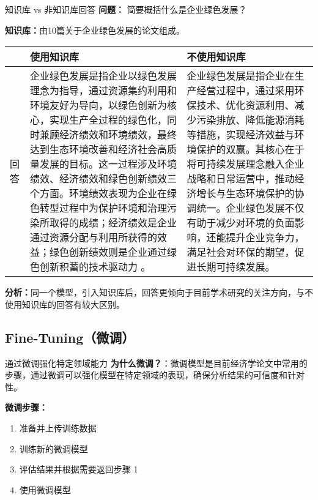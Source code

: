 \documentclass{beamer}
\begin{document}
\begin{frame}[fragile]{知识库 vs 非知识库回答}
\small
\textbf{问题：} 简要概括什么是企业绿色发展？

\textbf{知识库：}由10篇关于企业绿色发展的论文组成。

\begin{table}[h]
\centering
\scriptsize
\begin{tabular}{|p{0.5cm}|p{4.5cm}|p{4.3cm}|}
\hline
\textbf{} & \textbf{使用知识库} & \textbf{不使用知识库} \\
\hline
回答 & 
企业绿色发展是指企业以绿色发展理念为指导，通过资源集约利用和环境友好为导向，以绿色创新为核心，实现生产全过程的绿色化，同时兼顾经济绩效和环境绩效，最终达到生态环境改善和经济社会高质量发展的目标。这一过程涉及环境绩效、经济绩效和绿色创新绩效三个方面。环境绩效表现为企业在绿色转型过程中为保护环境和治理污染所取得的成绩；经济绩效是企业通过资源分配与利用所获得的效益；绿色创新绩效则是企业通过绿色创新积蓄的技术驱动力 。
& 
企业绿色发展是指企业在生产经营过程中，通过采用环保技术、优化资源利用、减少污染排放、降低能源消耗等措施，实现经济效益与环境保护的双赢。其核心在于将可持续发展理念融入企业战略和日常运营中，推动经济增长与生态环境保护的协调统一。企业绿色发展不仅有助于减少对环境的负面影响，还能提升企业竞争力，满足社会对环保的期望，促进长期可持续发展。 \\
\hline
\end{tabular}
\end{table}

\textbf{分析：}同一个模型，引入知识库后，回答更倾向于目前学术研究的关注方向，与不使用知识库的回答有较大区别。

\end{frame}

\subsection{Fine-Tuning（微调）}
\begin{frame}[fragile]{通过微调强化特定领域能力}
\small
\textbf{为什么微调？}：微调模型是目前经济学论文中常用的步骤，通过微调可以强化模型在特定领域的表现，确保分析结果的可信度和针对性。

\vspace{1em}
\textbf{微调步骤：}
\begin{enumerate}
    \item 准备并上传训练数据
    \item 训练新的微调模型
    \item 评估结果并根据需要返回步骤 1
    \item 使用微调模型
\end{enumerate}
\end{frame}
\end{document}
